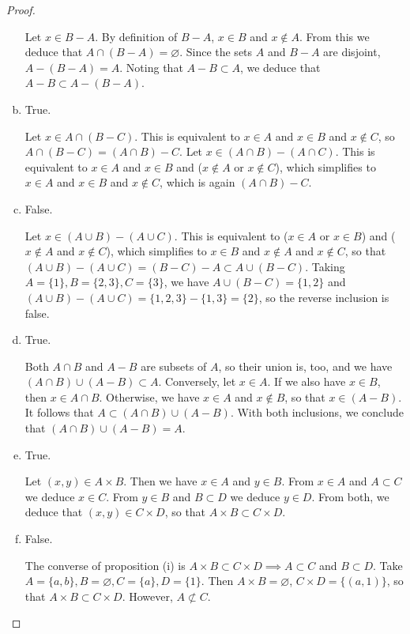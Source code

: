 \documentclass[11pt,a4paper,twoside]{article}
\theoremstyle{definition}
\begin{document}
\begin{proof}
\begin{enumerate}[(a)]
  Let $x \in B - A$. By definition of $B - A$, $x \in B$ and $x \notin A$. From this we deduce that $A \cap (B - A) = \varnothing$.
  Since the sets $A$ and $B - A$ are disjoint, $A - (B - A) = A$. Noting that $A - B \subset A$, we deduce that $A - B \subset A - (B - A)$.

\item True.

  Let $x \in A \cap (B - C)$. This is equivalent to $x \in A$ and $x \in B$ and $x \notin C$, so $A \cap (B - C) = (A \cap B) - C$.
  Let $x \in (A \cap B) - (A \cap C)$. This is equivalent to $x \in A$ and $x \in B$ and ($x \notin A$ or $x \notin C$), which simplifies to
  $x \in A$ and $x \in B$ and $x \notin C$, which is again $(A \cap B) - C$.

\item False.

  Let $x \in (A \cup B) - (A \cup C)$. This is equivalent to ($x \in A$ or $x \in B$) and ($x \notin A$ and $x \notin C$), which simplifies to
  $x \in B$ and $x \notin A$ and $x \notin C$, so that $(A \cup B) - (A \cup C) = (B - C) - A \subset A \cup (B - C)$.
  Taking $A = \{ 1 \}, B = \{ 2, 3 \}, C = \{ 3 \}$, we have $A \cup (B - C) = \{ 1, 2 \}$
  and $(A \cup B) - (A \cup C) = \{ 1, 2, 3 \} - \{ 1, 3 \} = \{ 2 \}$, so the reverse inclusion is false.

\item True.

  Both $A \cap B$ and $A - B$ are subsets of $A$, so their union is, too, and we have $(A \cap B) \cup (A - B) \subset A$.
  Conversely, let $x \in A$. If we also have $x \in B$, then $x \in A \cap B$. Otherwise, we have $x \in A$ and $x \notin B$, so that $x \in (A - B)$.
  It follows that $A \subset (A \cap B) \cup (A - B)$. With both inclusions, we conclude that $(A \cap B) \cup (A - B) = A$.

\item True.

  Let $(x, y) \in A \times B$. Then we have $x \in A$ and $y \in B$. From $x \in A$ and $A \subset C$ we deduce $x \in C$.
  From $y \in B$ and $B \subset D$ we deduce $y \in D$. From both, we deduce that $(x, y) \in C \times D$, so that $A \times B \subset C \times D$.

\item False.

  The converse of proposition (i) is $A \times B \subset C \times D \implies A \subset C$ and $B \subset D$.
  Take $A = \{ a, b \}, B = \varnothing, C = \{ a \}, D = \{ 1 \}$. Then $A \times B = \varnothing$, $C \times D = \{ (a, 1) \}$, so that $A \times B \subset C \times D$.
  However, $A \not\subset C$.


\end{enumerate}
\end{proof}
\end{document}
